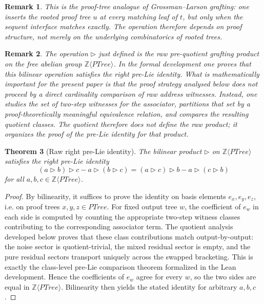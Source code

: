 \documentclass[11pt]{article}
\newtheorem{theorem}{Theorem}
\newtheorem{remark}[theorem]{Remark}
\newcommand{\PTree}{\mathit{PTree}}
\newcommand{\ZZ}{\mathbb{Z}}
\begin{document}
\begin{remark}
This is the proof-tree analogue of Grossman--Larson grafting: one inserts the
rooted proof tree \(u\) at every matching leaf of \(t\), but only when the
sequent interface matches exactly. The operation therefore depends on proof
structure, not merely on the underlying combinatorics of rooted trees.
\end{remark}

\begin{remark}
The operation \(\triangleright\) just defined is the \emph{raw pre-quotient
grafting product} on the free abelian group \(\ZZ\langle\PTree\rangle\). In
the formal development one proves that this bilinear operation satisfies the
right pre-Lie identity. What is mathematically important for the present paper
is that the proof strategy analysed below does not proceed by a direct
cardinality comparison of raw address witnesses. Instead, one studies the set
of \emph{two-step witnesses} for the associator, partitions that set by a
proof-theoretically meaningful equivalence relation, and compares the
resulting quotient classes. The quotient therefore does not define the raw
product; it organizes the proof of the pre-Lie identity for that product.
\end{remark}

\begin{theorem}[Raw right pre-Lie identity]
The bilinear product \(\triangleright\) on \(\ZZ\langle\PTree\rangle\)
satisfies the right pre-Lie identity
\[
(a\triangleright b)\triangleright c-a\triangleright (b\triangleright c)
=
(a\triangleright c)\triangleright b-a\triangleright (c\triangleright b)
\]
for all \(a,b,c\in \ZZ\langle\PTree\rangle\).
\end{theorem}

\begin{proof}
By bilinearity, it suffices to prove the identity on basis elements
\(e_x,e_y,e_z\), i.e. on proof trees \(x,y,z\in \PTree\). For fixed output
tree \(w\), the coefficient of \(e_w\) in each side is computed by counting the
appropriate two-step witness classes contributing to the corresponding
associator term. The quotient analysis developed below proves that these class
contributions match output-by-output: the noise sector is quotient-trivial, the
mixed residual sector is empty, and the pure residual sectors transport
uniquely across the swapped bracketing. This is exactly the class-level pre-Lie
comparison theorem formalized in the Lean development. Hence the coefficients
of \(e_w\) agree for every \(w\), so the two sides are equal in
\(\ZZ\langle\PTree\rangle\). Bilinearity then yields the stated identity for
arbitrary \(a,b,c\).
\end{proof}
\end{document}
